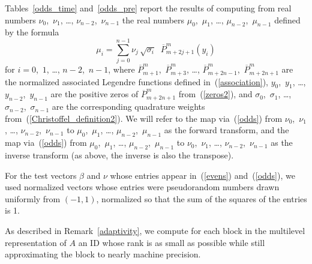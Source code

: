 \documentclass[final,3p,times]{elsarticle}
\begin{document}
Tables~\ref{odds_time} and~\ref{odds_pre} report the results
of computing from real numbers
$\nu_0$,~$\nu_1$, \dots, $\nu_{n-2}$,~$\nu_{n-1}$
the real numbers $\mu_0$,~$\mu_1$, \dots, $\mu_{n-2}$,~$\mu_{n-1}$
defined by the formula
\begin{equation}
\label{odds}
\mu_i = \sum_{j=0}^{n-1} \nu_j \, \sqrt{\sigma_i} \;\;
        \overline{P}^m_{m+2j+1}(y_i)
\end{equation}
for $i = 0$,~$1$, \dots, $n-2$,~$n-1$,
where $\overline{P}^m_{m+1}$,~$\overline{P}^m_{m+3}$, \dots,
$\overline{P}^m_{m+2n-1}$,~$\overline{P}^m_{m+2n+1}$
are the normalized associated Legendre functions defined
in~(\ref{association}),
$y_0$,~$y_1$, \dots, $y_{n-2}$,~$y_{n-1}$ are the positive zeros
of $\overline{P}^m_{m+2n+1}$ from~(\ref{zeros2}),
and $\sigma_0$,~$\sigma_1$, \dots, $\sigma_{n-2}$,~$\sigma_{n-1}$
are the corresponding quadrature weights from~(\ref{Christoffel_definition2}).
We will refer to the map via~(\ref{odds})
from $\nu_0$,~$\nu_1$, \dots, $\nu_{n-2}$,~$\nu_{n-1}$
to $\mu_0$,~$\mu_1$, \dots, $\mu_{n-2}$,~$\mu_{n-1}$
as the forward transform, and the map via~(\ref{odds})
from $\mu_0$,~$\mu_1$, \dots, $\mu_{n-2}$,~$\mu_{n-1}$
to $\nu_0$,~$\nu_1$, \dots, $\nu_{n-2}$,~$\nu_{n-1}$
as the inverse transform (as above, the inverse is also the transpose).

For the test vectors $\beta$ and $\nu$ whose entries appear
in~(\ref{evens}) and~(\ref{odds}), we used normalized vectors whose entries
were pseudorandom numbers drawn uniformly from $(-1,1)$,
normalized so that the sum of the squares of the entries is 1.

As described in Remark~\ref{adaptivity},
we compute for each block in the multilevel representation of $A$
an ID whose rank is as small as possible while still approximating
the block to nearly machine precision.
\end{document}

